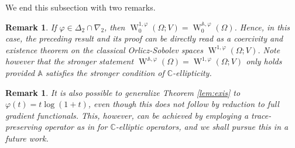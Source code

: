 \documentclass[a4paper,11pt]{amsart}
\numberwithin{equation}{section}
\newcommand{\sobo}{\operatorname{W}}
\newtheorem{bem}[defi]{Remark}
\begin{document}
	We end this subsection with two remarks.
	\begin{bem}
		If $\varphi\in\Delta_{2}\cap\nabla_{2}$, then $\sobo_{0}^{1,\varphi}(\Omega;V)=\sobo_{0}^{\mathbb{A},\varphi}(\Omega)$. Hence, in this case, the preceding result and its proof can be directly read as a coercivity and existence theorem on the classical {Orlicz-Sobolev} spaces $\sobo^{1,\varphi}(\Omega;V)$. Note however that the stronger statement $\sobo^{\mathbb{A},\varphi}(\Omega)=\sobo^{1,\varphi}(\Omega;V)$ only holds provided $\mathbb{A}$ satisfies the stronger condition of $\mathbb{C}$-ellipticity. 
	\end{bem}
	\begin{bem}
		It is also possible to generalize Theorem \ref{lem:exis} to $\varphi(t)=t\log(1+t)$,  even though this does not follow by reduction to full gradient functionals. {This, however, can} be achieved by employing a trace-preserving operator as in \cite[Prop. 10.9]{gmeineder_quasiconvex_2024} for $\mathbb{C}$-elliptic operators, and we shall pursue this in a future work. 
	\end{bem}
\end{document}
